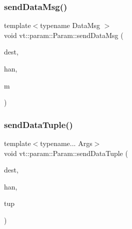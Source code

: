 \subsubsection{\texorpdfstring{send\+Data\+Msg()}{sendDataMsg()}}
{\footnotesize\ttfamily template$<$typename Data\+Msg $>$ \\
void vt\+::param\+::\+Param\+::send\+Data\+Msg (\begin{DoxyParamCaption}\item[{\hyperlink{namespacevt_a866da9d0efc19c0a1ce79e9e492f47e2}{Node\+Type} const \&}]{dest,  }\item[{\hyperlink{namespacevt_af64846b57dfcaf104da3ef6967917573}{Handler\+Type} const \+\_\+\+\_\+attribute\+\_\+\+\_\+((unused))}]{han,  }\item[{\hyperlink{namespacevt_ab2b3d506ec8e8d1540aede826d84a239}{Msg\+Shared\+Ptr}$<$ \hyperlink{structvt_1_1param_1_1_data_msg}{Data\+Msg} $>$}]{m }\end{DoxyParamCaption})\hspace{0.3cm}{\ttfamily [inline]}}

\mbox{\label{structvt_1_1param_1_1_param_adf25c8f5db146087b244ab244f874000}} 
\subsubsection{\texorpdfstring{send\+Data\+Tuple()}{sendDataTuple()}}
{\footnotesize\ttfamily template$<$typename... Args$>$ \\
void vt\+::param\+::\+Param\+::send\+Data\+Tuple (\begin{DoxyParamCaption}\item[{\hyperlink{namespacevt_a866da9d0efc19c0a1ce79e9e492f47e2}{Node\+Type} const \&}]{dest,  }\item[{\hyperlink{namespacevt_af64846b57dfcaf104da3ef6967917573}{Handler\+Type} const}]{han,  }\item[{std\+::tuple$<$ Args... $>$ \&\&}]{tup }\end{DoxyParamCaption})\hspace{0.3cm}{\ttfamily [inline]}}

\mbox{\label{structvt_1_1param_1_1_param_a8d670f74eb5f0a1b5ea312e8b174b648}} 
